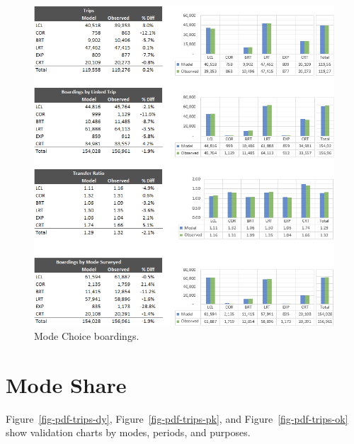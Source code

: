 \documentclass[
  letterpaper,
  DIV=11,
  numbers=noendperiod]{scrreprt}
\begin{document}
\begin{figure}[H]

{\centering \includegraphics{v9x/v900/validation/_pictures/6-plot1.png}

}

\caption{\label{fig-pdf-boardings}Mode Choice boardings.}

\end{figure}

\hypertarget{mode-share-1}{%
\section{Mode Share}\label{mode-share-1}}

Figure~\ref{fig-pdf-trips-dy}, Figure~\ref{fig-pdf-trips-pk}, and
Figure~\ref{fig-pdf-trips-ok} show validation charts by modes, periods,
and purposes.
\end{document}

